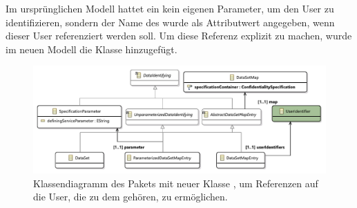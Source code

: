 \documentclass[twoside, ngerman]{sdqseminar}
\begin{document}
Im ursprünglichen Modell hattet ein  kein eigenen Parameter, um den User zu identifizieren, sondern der Name des  wurde als Attributwert angegeben, wenn dieser User referenziert werden soll. Um diese Referenz explizit zu machen, wurde im neuen Modell die Klasse  hinzugefügt.

\begin{figure}[htbp]
	
	\centering
	\includegraphics[width=\textwidth]{images/new/data.pdf}
	\caption{Klassendiagramm des Pakets  mit neuer Klasse , um Referenzen auf die User, die zu dem  gehören, zu ermöglichen.}\label{dataPackage}
\end{figure}
\end{document}
